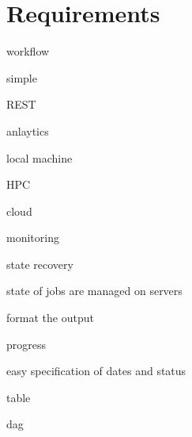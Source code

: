 
\section{Requirements}

workflow

simple

REST

anlaytics

local machine 

HPC

cloud 

monitoring

state recovery

state of jobs are managed on servers

format the output

progress

easy specification of dates and status

table 

dag
